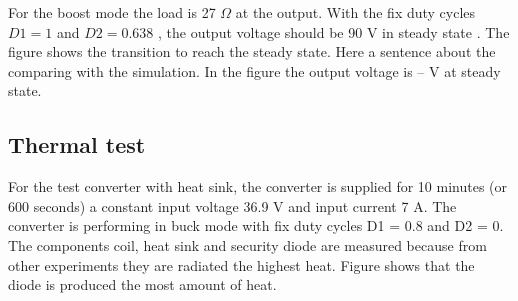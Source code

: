 For the boost mode the load is 27 $\Omega$ at the output. With the fix duty cycles $D1 = 1$ and  $D2 = 0.638$ , the output voltage should be 90 V in steady state . The figure shows the transition to reach the steady state. Here a sentence about the comparing with the simulation.  In the figure the output voltage is -- V  at steady state.

\subsection{Thermal test}

For the test converter with heat sink, the converter is supplied for 10 minutes (or 600 seconds) a constant input voltage 36.9 V and input current 7 A. The converter is performing in buck mode with fix duty cycles D1 = 0.8 and D2 = 0. The components coil, heat sink and security diode are measured because from other experiments they are radiated the highest heat. Figure shows that the diode is produced the most amount of heat.

